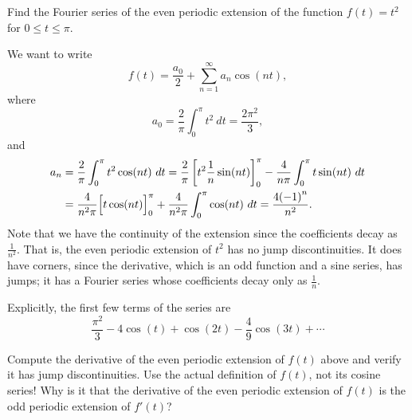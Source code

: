
\begin{example}
Find the Fourier series of the even periodic extension of 
the function $f(t) = t^2$ for $0 \leq t \leq \pi$.

We want to write
\begin{equation*}
f(t) = \frac{a_0}{2} + \sum_{n=1}^\infty a_n \cos (n t) ,
\end{equation*}
where
\begin{equation*}
a_0 = \frac{2}{\pi}
\int_0^\pi t^2 ~ dt = \frac{2 \pi^2}{3} ,
\end{equation*}
and
\begin{equation*}
\begin{split}
a_n & = \frac{2}{\pi}
\int_0^\pi t^2 \cos (n t) ~ dt
= \frac{2}{\pi} \left[ t^2 \frac{1}{n} \sin (nt) \right]_0^\pi -
\frac{4}{n\pi}
\int_0^\pi t \sin (n t) ~ dt \\
& = 
\frac{4}{n^2\pi}
\Bigl[ t \cos (n t) \Bigr]_0^\pi
+
\frac{4}{n^2\pi}
\int_0^\pi \cos (n t) ~ dt
= 
\frac{4{(-1)}^n}{n^2} .
\end{split}
\end{equation*}
Note that we have  the continuity of the extension since the
coefficients decay as $\frac{1}{n^2}$.  That is, the even periodic extension
of $t^2$ has no jump discontinuities.  It does have corners, since
the derivative, which is an odd function and a sine series, has jumps; it has
a Fourier series whose coefficients decay only as $\frac{1}{n}$.

Explicitly, the first few terms of the series are
\begin{equation*}
\frac{\pi^2}{3} - 4 \cos (t) + \cos (2t) - \frac{4}{9} \cos (3t) + \cdots
\end{equation*}
\end{example}

\begin{exercise}
\leavevmode
\begin{tasks}
\task Compute the derivative of the even periodic extension of $f(t)$ above and verify it
has jump discontinuities.  Use the actual definition of $f(t)$, not its cosine
series!
\task Why is it that the derivative of the even periodic extension of $f(t)$ is the
odd periodic extension of $f'(t)$?
\end{tasks}
\end{exercise}

